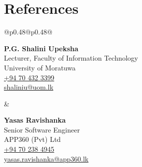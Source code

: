 \documentclass[letterpaper,11pt]{article}
\begin{document}
\section{References}
\small
\begin{center}
\begin{tabular}{@{}p{0.48\textwidth}@{\hspace{0.04\textwidth}}p{0.48\textwidth}@{}}
\parbox[t]{\linewidth}{
\textbf{P.G. Shalini Upeksha}\\
Lecturer,
Faculty of Information Technology\\University of Moratuwa\\
\href{tel:+94704323399}{+94 70 432 3399}\\
\href{mailto:shaliniu@uom.lk}{shaliniu@uom.lk}
}
&
\parbox[t]{\linewidth}{
\textbf{Yasas Ravishanka}\\
Senior Software Engineer\\
APP360 (Pvt) Ltd\\
\href{tel:+94702384945}{+94 70 238 4945}\\
\href{mailto:yasas.ravishanka@app360.lk}{yasas.ravishanka@app360.lk}
}
\end{tabular}
\end{center}
\end{document}
